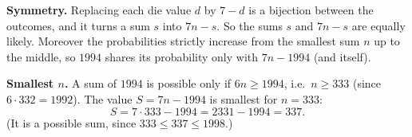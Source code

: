 \textbf{Symmetry.} Replacing each die value $d$ by $7-d$ is a bijection between the outcomes, and it turns a sum $s$ into $7n-s$. So the sums $s$ and $7n-s$ are equally likely. Moreover the probabilities strictly increase from the smallest sum $n$ up to the middle, so $1994$ shares its probability only with $7n-1994$ (and itself).

\textbf{Smallest $n$.} A sum of $1994$ is possible only if $6n\ge1994$, i.e.\ $n\ge333$ (since $6\cdot332=1992$). The value $S=7n-1994$ is smallest for $n=333$:
\[
S=7\cdot333-1994=2331-1994=\boxed{337}.
\]
(It is a possible sum, since $333\le337\le1998$.)
